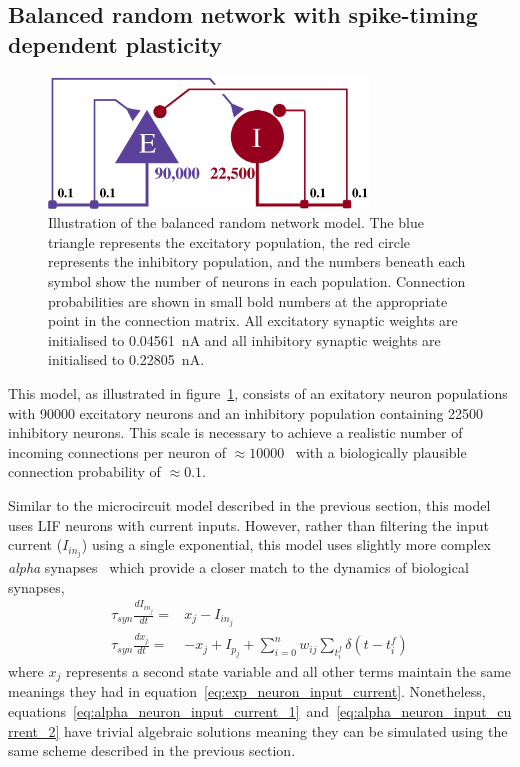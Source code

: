\documentclass[utf8]{frontiersSCNS} %
\begin{document}
\subsection{Balanced random network with spike-timing dependent plasticity}
\label{sec:method/balanced_random}

\begin{figure}
    \begin{center}
        \includegraphics[width=85mm]{figures/circuit2}
    \end{center}
    \caption{Illustration of the balanced random network model.
    The blue triangle represents the excitatory population, the red circle represents the inhibitory population, and the numbers beneath each symbol show the number of neurons in each population.
    Connection probabilities are shown in small bold numbers at the appropriate point in the connection matrix.
    All excitatory synaptic weights are initialised to \SI{0.04561}{\nano\ampere} and all inhibitory synaptic weights are initialised to \SI{0.22805}{\nano\ampere}.}
    \label{fig:balanced_random_circuit}
\end{figure}

This model, as illustrated in figure~\ref{fig:balanced_random_circuit}, consists of an exitatory neuron populations with \num{90000} excitatory neurons and an inhibitory population containing \num{22500} inhibitory neurons. This scale is necessary to achieve a realistic number of incoming connections per neuron of $\approx 10000$~\citep{braitenberg2013cortex} with a biologically plausible connection probability of $\approx 0.1$.

Similar to the microcircuit model described in the previous section, this model uses LIF neurons with current inputs.
However, rather than filtering the input current ($I_{{in}_{j}}$) using a single exponential, this model uses slightly more complex \textit{alpha} synapses~\citep{Rall1967} which provide a closer match to the dynamics of biological synapses,
%
\begin{align}
    \tau_{syn} \frac{dI_{{in}_{j}}}{dt} = & x_{j} - I_{{in}_{j}} \label{eq:alpha_neuron_input_current_1}\\ 
    \tau_{syn} \frac{dx_{j}}{dt} = & -x_{j} + I_{p_{j}} + \sum_{i=0}^{n} w_{ij} \sum_{t_{i}^{f}}  \delta(t - t_{i}^{f}) \label{eq:alpha_neuron_input_current_2}
\end{align}
%
where $x_{j}$ represents a second state variable and all other terms maintain the same meanings they had in equation~\ref{eq:exp_neuron_input_current}.
Nonetheless, equations~\ref{eq:alpha_neuron_input_current_1}~and~\ref{eq:alpha_neuron_input_current_2} have trivial algebraic solutions meaning they can be simulated using the same scheme described in the previous section.
\end{document}
